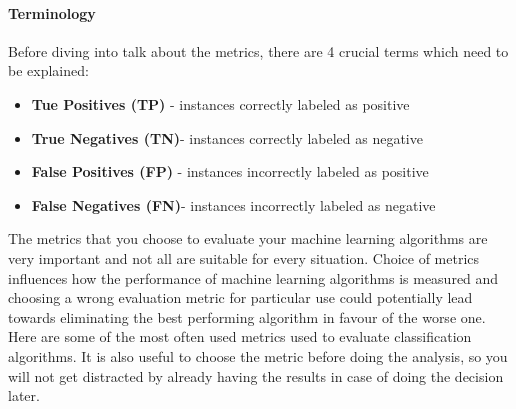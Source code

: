 \paragraph{Terminology} Before diving into talk about the metrics, there are 4 crucial terms which need to be explained:
\begin{itemize}
\item \textbf{Tue Positives (TP)} - instances correctly labeled as positive
\item \textbf{True Negatives (TN)}- instances correctly labeled as negative
\item \textbf{False Positives (FP)} - instances incorrectly labeled as positive
\item \textbf{False Negatives (FN)}- instances incorrectly labeled as negative
\end{itemize}


The metrics that you choose to evaluate your machine learning algorithms are very important and not all are suitable for every situation. Choice of metrics influences how the performance of machine learning algorithms is measured and choosing a wrong evaluation metric for particular use could potentially lead towards eliminating the best performing algorithm in favour of the worse one.
Here are some of the most often used metrics used to evaluate classification algorithms. It is also useful to choose the metric before doing the analysis, so you will not get distracted by already having the results in case of doing the decision later.

